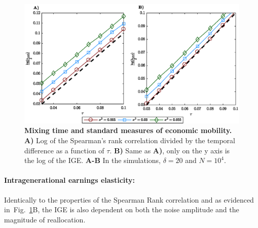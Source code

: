 \documentclass[11pt]{article}
\newcommand{\ie}{{\it i.e.}\xspace}
\newcommand{\fref}[1]{Fig.~\ref{fig:#1}}
\numberwithin{equation}{section}
\begin{document}
\begin{figure}[!htb]
\centering
\includegraphics[width=1.0\textwidth]{figs/fig_rgbm_standard_measures.eps}
\caption{\textbf{Mixing time and standard measures of economic mobility.} \textbf{A)} Log of the Spearman's rank correlation divided by the temporal difference as a function of $\tau$. \textbf{B)} Same as \textbf{A)}, only on the y axis is the log of the IGE. %
\textbf{A-B} In the simulations, $\delta = 20$ and $N = 10^4$.
\label{fig:rgbm-standard-measures}}
\end{figure}

\paragraph{Intragenerational earnings elasticity:} Identically to the properties of the Spearman Rank correlation and as evidenced in~\fref{rgbm-standard-measures}B, the IGE is also dependent on both the noise amplitude and the magnitude of reallocation.

\end{document}
